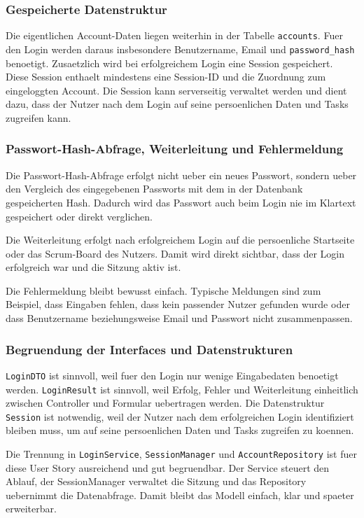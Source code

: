 \documentclass[a4paper,11pt]{article}
\begin{document}
\subsubsection*{Gespeicherte Datenstruktur}

Die eigentlichen Account-Daten liegen weiterhin in der Tabelle \texttt{accounts}. Fuer den Login werden daraus insbesondere Benutzername, Email und \texttt{password\_hash} benoetigt. Zusaetzlich wird bei erfolgreichem Login eine Session gespeichert. Diese Session enthaelt mindestens eine Session-ID und die Zuordnung zum eingeloggten Account. Die Session kann serverseitig verwaltet werden und dient dazu, dass der Nutzer nach dem Login auf seine persoenlichen Daten und Tasks zugreifen kann.

\subsubsection*{Passwort-Hash-Abfrage, Weiterleitung und Fehlermeldung}

Die Passwort-Hash-Abfrage erfolgt nicht ueber ein neues Passwort, sondern ueber den Vergleich des eingegebenen Passworts mit dem in der Datenbank gespeicherten Hash. Dadurch wird das Passwort auch beim Login nie im Klartext gespeichert oder direkt verglichen.

Die Weiterleitung erfolgt nach erfolgreichem Login auf die persoenliche Startseite oder das Scrum-Board des Nutzers. Damit wird direkt sichtbar, dass der Login erfolgreich war und die Sitzung aktiv ist.

Die Fehlermeldung bleibt bewusst einfach. Typische Meldungen sind zum Beispiel, dass Eingaben fehlen, dass kein passender Nutzer gefunden wurde oder dass Benutzername beziehungsweise Email und Passwort nicht zusammenpassen.

\subsubsection*{Begruendung der Interfaces und Datenstrukturen}

\texttt{LoginDTO} ist sinnvoll, weil fuer den Login nur wenige Eingabedaten benoetigt werden. \texttt{LoginResult} ist sinnvoll, weil Erfolg, Fehler und Weiterleitung einheitlich zwischen Controller und Formular uebertragen werden. Die Datenstruktur \texttt{Session} ist notwendig, weil der Nutzer nach dem erfolgreichen Login identifiziert bleiben muss, um auf seine persoenlichen Daten und Tasks zugreifen zu koennen.

Die Trennung in \texttt{LoginService}, \texttt{SessionManager} und \texttt{AccountRepository} ist fuer diese User Story ausreichend und gut begruendbar. Der Service steuert den Ablauf, der SessionManager verwaltet die Sitzung und das Repository uebernimmt die Datenabfrage. Damit bleibt das Modell einfach, klar und spaeter erweiterbar.
\end{document}
